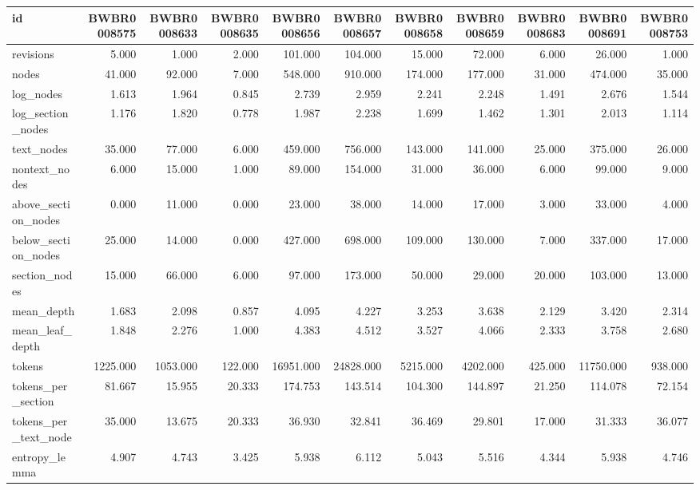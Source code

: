 \begin{tabular}{lrrrrrrrrrr}
\toprule
id & BWBR0008575 & BWBR0008633 & BWBR0008635 & BWBR0008656 & BWBR0008657 & BWBR0008658 & BWBR0008659 & BWBR0008683 & BWBR0008691 & BWBR0008753 \\
\midrule
revisions & 5.000 & 1.000 & 2.000 & 101.000 & 104.000 & 15.000 & 72.000 & 6.000 & 26.000 & 1.000 \\
\cline{1-11}
nodes & 41.000 & 92.000 & 7.000 & 548.000 & 910.000 & 174.000 & 177.000 & 31.000 & 474.000 & 35.000 \\
\cline{1-11}
log\_nodes & 1.613 & 1.964 & 0.845 & 2.739 & 2.959 & 2.241 & 2.248 & 1.491 & 2.676 & 1.544 \\
\cline{1-11}
log\_section\_nodes & 1.176 & 1.820 & 0.778 & 1.987 & 2.238 & 1.699 & 1.462 & 1.301 & 2.013 & 1.114 \\
\cline{1-11}
text\_nodes & 35.000 & 77.000 & 6.000 & 459.000 & 756.000 & 143.000 & 141.000 & 25.000 & 375.000 & 26.000 \\
\cline{1-11}
nontext\_nodes & 6.000 & 15.000 & 1.000 & 89.000 & 154.000 & 31.000 & 36.000 & 6.000 & 99.000 & 9.000 \\
\cline{1-11}
above\_section\_nodes & 0.000 & 11.000 & 0.000 & 23.000 & 38.000 & 14.000 & 17.000 & 3.000 & 33.000 & 4.000 \\
\cline{1-11}
below\_section\_nodes & 25.000 & 14.000 & 0.000 & 427.000 & 698.000 & 109.000 & 130.000 & 7.000 & 337.000 & 17.000 \\
\cline{1-11}
section\_nodes & 15.000 & 66.000 & 6.000 & 97.000 & 173.000 & 50.000 & 29.000 & 20.000 & 103.000 & 13.000 \\
\cline{1-11}
mean\_depth & 1.683 & 2.098 & 0.857 & 4.095 & 4.227 & 3.253 & 3.638 & 2.129 & 3.420 & 2.314 \\
\cline{1-11}
mean\_leaf\_depth & 1.848 & 2.276 & 1.000 & 4.383 & 4.512 & 3.527 & 4.066 & 2.333 & 3.758 & 2.680 \\
\cline{1-11}
tokens & 1225.000 & 1053.000 & 122.000 & 16951.000 & 24828.000 & 5215.000 & 4202.000 & 425.000 & 11750.000 & 938.000 \\
\cline{1-11}
tokens\_per\_section & 81.667 & 15.955 & 20.333 & 174.753 & 143.514 & 104.300 & 144.897 & 21.250 & 114.078 & 72.154 \\
\cline{1-11}
tokens\_per\_text\_node & 35.000 & 13.675 & 20.333 & 36.930 & 32.841 & 36.469 & 29.801 & 17.000 & 31.333 & 36.077 \\
\cline{1-11}
entropy\_lemma & 4.907 & 4.743 & 3.425 & 5.938 & 6.112 & 5.043 & 5.516 & 4.344 & 5.938 & 4.746 \\

\end{tabular}

